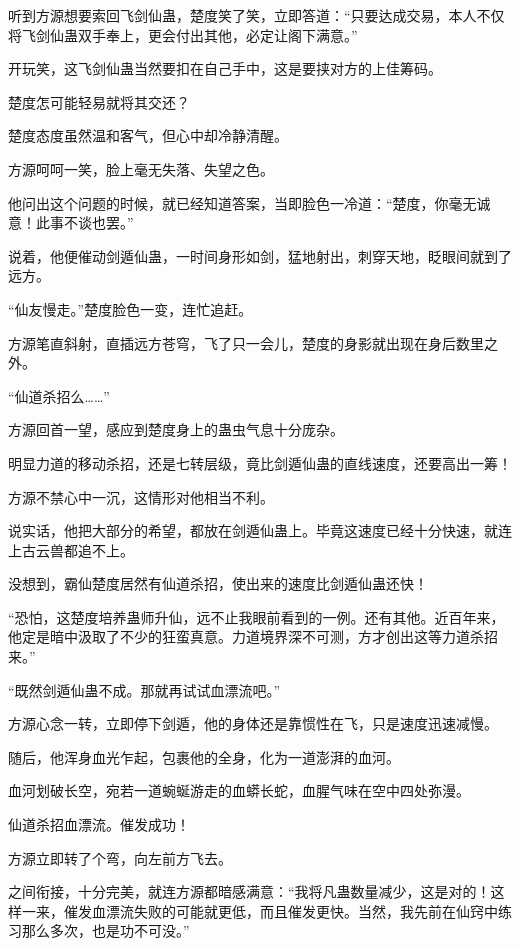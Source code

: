 
\begin{this_body}



听到方源想要索回飞剑仙蛊，楚度笑了笑，立即答道：“只要达成交易，本人不仅将飞剑仙蛊双手奉上，更会付出其他，必定让阁下满意。”

开玩笑，这飞剑仙蛊当然要扣在自己手中，这是要挟对方的上佳筹码。

楚度怎可能轻易就将其交还？

楚度态度虽然温和客气，但心中却冷静清醒。

方源呵呵一笑，脸上毫无失落、失望之色。

他问出这个问题的时候，就已经知道答案，当即脸色一冷道：“楚度，你毫无诚意！此事不谈也罢。”

说着，他便催动剑遁仙蛊，一时间身形如剑，猛地射出，刺穿天地，眨眼间就到了远方。

“仙友慢走。”楚度脸色一变，连忙追赶。

方源笔直斜射，直插远方苍穹，飞了只一会儿，楚度的身影就出现在身后数里之外。

“仙道杀招么……”

方源回首一望，感应到楚度身上的蛊虫气息十分庞杂。

明显力道的移动杀招，还是七转层级，竟比剑遁仙蛊的直线速度，还要高出一筹！

方源不禁心中一沉，这情形对他相当不利。

说实话，他把大部分的希望，都放在剑遁仙蛊上。毕竟这速度已经十分快速，就连上古云兽都追不上。

没想到，霸仙楚度居然有仙道杀招，使出来的速度比剑遁仙蛊还快！

“恐怕，这楚度培养蛊师升仙，远不止我眼前看到的一例。还有其他。近百年来，他定是暗中汲取了不少的狂蛮真意。力道境界深不可测，方才创出这等力道杀招来。”

“既然剑遁仙蛊不成。那就再试试血漂流吧。”

方源心念一转，立即停下剑遁，他的身体还是靠惯性在飞，只是速度迅速减慢。

随后，他浑身血光乍起，包裹他的全身，化为一道澎湃的血河。

血河划破长空，宛若一道蜿蜒游走的血蟒长蛇，血腥气味在空中四处弥漫。

仙道杀招血漂流。催发成功！

方源立即转了个弯，向左前方飞去。

之间衔接，十分完美，就连方源都暗感满意：“我将凡蛊数量减少，这是对的！这样一来，催发血漂流失败的可能就更低，而且催发更快。当然，我先前在仙窍中练习那么多次，也是功不可没。”


\end{this_body}
